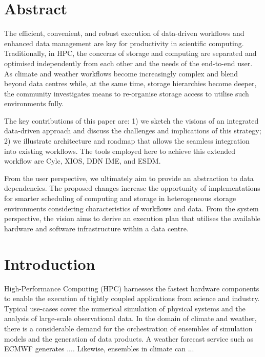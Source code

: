 \documentclass[a4paper]{article}
\title{\papertitle}
\author{
}
\date{\today}
\newcommand{\jk}[1]{\todo[inline]{JK: #1}}
\begin{document}
\maketitle
\thispagestyle{fancy}

\section*{Abstract}
The efficient, convenient, and robust execution of data-driven workflows and enhanced data management are key for productivity in scientific computing.
Traditionally, in HPC, the concerns of storage and computing are separated and optimised independently from each other and the needs of the end-to-end user.
As climate and weather workflows become increasingly complex and blend beyond data centres while, at the same time, storage hierarchies become deeper, the community investigates means to re-organise storage access to utilise such environments fully.

The key contributions of this paper are:
1) we sketch the visions of an integrated data-driven approach and discuss the challenges and implications of this strategy;
2) we illustrate architecture and roadmap that allows the seamless integration into existing workflows.
The tools employed here to achieve this extended workflow are Cylc, XIOS, DDN IME, and ESDM.

From the user perspective, we ultimately aim to provide an abstraction to data dependencies.
The proposed changes increase the opportunity of implementations for smarter scheduling of computing and storage in heterogeneous storage environments considering characteristics of workflows and data.
From the system perspective, the vision aims to derive an execution plan that utilises the available hardware and software infrastructure within a data centre.


\section{Introduction}

High-Performance Computing (HPC) harnesses the fastest hardware components to enable the execution of tightly coupled applications from science and industry.
Typical use-cases cover the numerical simulation of physical systems and the analysis of large-scale observational data.
In the domain of climate and weather, there is a considerable demand for the orchestration of ensembles of simulation models and the generation of data products.
A weather forecast service such as ECMWF generates .... \jk{Cylc team, please provide some facts}
Likewise, ensembles in climate can ...
\end{document}
